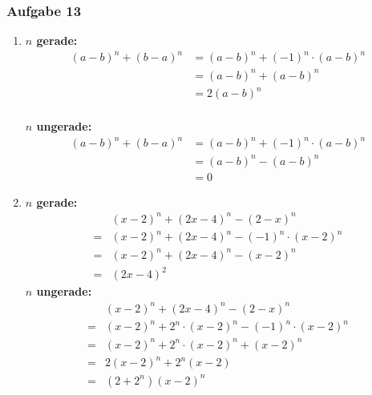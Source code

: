 \subsubsection{Aufgabe 13}
\begin{enumerate}
	\item \textbf{$ n $ gerade:} \begin{align*} (a-b)^n + (b-a)^n &= (a-b)^n + (-1)^n\cdot(a-b)^n \\
																																&= (a-b)^n + (a-b)^n \\
																																&= 2(a-b)^n \end{align*} \\
				\textbf{$ n $ ungerade:} \begin{align*}  (a-b)^n + (b-a)^n	&= (a-b)^n + (-1)^n\cdot(a-b)^n \\
																																		&= (a-b)^n -(a-b)^n \\
																																		&= 0 \end{align*}							%
	\item \textbf{$ n $ gerade:}\begin{align*}  &(x-2)^n + (2x-4)^n - (2-x)^n	\\
																						= &(x-2)^n + (2x-4)^n - (-1)^n\cdot(x-2)^n \\
																						= &(x-2)^n + (2x-4)^n - (x-2)^n \\
																						= &(2x-4)^2 \end{align*}	
				\textbf{$ n $ ungerade:} \begin{align*}	&(x-2)^n + (2x-4)^n - (2-x)^n	\\
																							= &(x-2)^n + 2^n\cdot(x-2)^n - (-1)^n\cdot(x-2)^n \\
																							= &(x-2)^n + 2^n\cdot(x-2)^n + (x-2)^n \\
																							= &2(x-2)^n + 2^n(x-2) \\
																							= &(2+2^n)(x-2)^n \end{align*}%
\end{enumerate}
